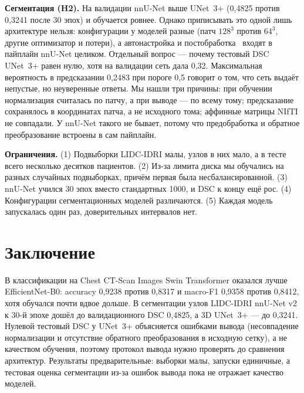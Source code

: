 \documentclass{misisarticle}
\begin{document}
\textbf{Сегментация (H2).} На валидации nnU-Net выше UNet~3+ (0,4825 против 0,3241 после 30 эпох) и обучается ровнее. Однако приписывать это одной лишь архитектуре нельзя: конфигурации у моделей разные (патч $128^3$ против $64^3$, другие оптимизатор и потери), а автонастройка и постобработка~\cite{isensee} входят в пайплайн nnU-Net целиком. Отдельный вопрос — почему тестовый DSC UNet~3+ равен нулю, хотя на валидации сеть дала 0,32. Максимальная вероятность в предсказании 0,2483 при пороге 0,5 говорит о том, что сеть выдаёт непустые, но неуверенные ответы. Мы нашли три причины: при обучении нормализация считалась по патчу, а при выводе — по всему тому; предсказание сохранялось в координатах патча, а не исходного тома; аффинные матрицы NIfTI не совпадали. У nnU-Net такого не бывает, потому что предобработка и обратное преобразование встроены в сам пайплайн.

\textbf{Ограничения.} (1) Подвыборки LIDC-IDRI малы, узлов в них мало, а в тесте всего несколько десятков пациентов. (2) Из-за лимита диска мы обучались на разных случайных подвыборках, причём первая была несбалансированной. (3) nnU-Net учился 30 эпох вместо стандартных 1000, и DSC к концу ещё рос. (4) Конфигурации сегментационных моделей различаются. (5) Каждая модель запускалась один раз, доверительных интервалов нет.

\section{Заключение}
В классификации на Chest CT-Scan Images Swin Transformer оказался лучше EfficientNet-B0: accuracy 0,9238 против 0,8317 и macro-F1 0,9358 против 0,8412, хотя обучался почти вдвое дольше. В сегментации узлов LIDC-IDRI nnU-Net v2 к 30-й эпохе дошёл до валидационного DSC 0,4825, а 3D UNet~3+ — до 0,3241. Нулевой тестовый DSC у UNet~3+ объясняется ошибками вывода (несовпадение нормализации и отсутствие обратного преобразования в исходную сетку), а не качеством обучения, поэтому протокол вывода нужно проверять до сравнения архитектур. Результаты предварительные: выборки малы, запуски единичные, а тестовая оценка сегментации из-за ошибок вывода пока не отражает качество моделей.
\end{document}
